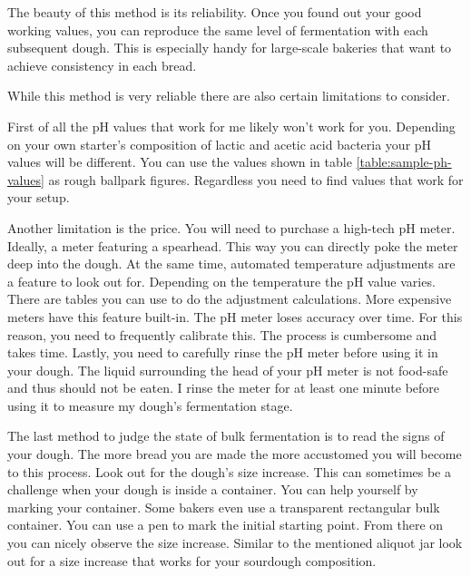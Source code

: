 The beauty of this method is its reliability. Once you found
out your good working values, you can reproduce
the same level of fermentation with each subsequent dough.
This is especially handy for large-scale bakeries that want
to achieve consistency in each bread.

While this method is very reliable there are also certain
limitations to consider.

First of all the pH values that work for me likely won't work for
you. Depending on your own starter's composition of lactic 
and acetic acid bacteria your pH values will be different.
You can use the values shown in table \ref{table:sample-ph-values}
as rough ballpark figures. Regardless you need to find values
that work for your setup.

Another limitation is the price. You will need to purchase
a high-tech pH meter. Ideally, a meter featuring a spearhead.
This way you can directly poke the meter deep into the dough.
At the same time, automated temperature adjustments are a
feature to look out for. Depending on the temperature
the pH value varies. There are tables you can use to
do the adjustment calculations. More expensive meters
have this feature built-in. The pH meter loses accuracy
over time. For this reason, you need to frequently
calibrate this. The process is cumbersome and takes time.
Lastly, you need to carefully rinse the pH meter before
using it in your dough. The liquid surrounding the
head of your pH meter is not food-safe and thus should
not be eaten. I rinse the meter for at least one minute
before using it to measure my dough's fermentation stage.

The last method to judge the state of bulk fermentation
is to read the signs of your dough. The more bread you are
made the more accustomed you will become to this process.
Look out for the dough's size increase. This can sometimes
be a challenge when your dough is inside a container.
You can help yourself by marking your container. Some bakers
even use a transparent rectangular bulk container. You
can use a pen to mark the initial starting point. From there
on you can nicely observe the size increase. Similar to the
mentioned aliquot jar look out for a size increase that works
for your sourdough composition.

